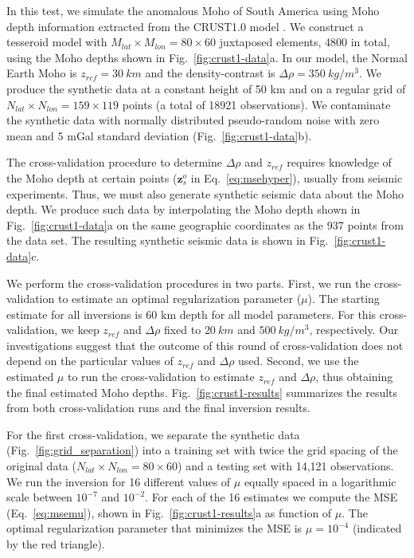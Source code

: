 \documentclass[extra,mreferee]{gji}
\begin{document}
In this test, we simulate the anomalous Moho of South America
using Moho depth information extracted from the CRUST1.0 model
\citep{laske2013}.
We construct a tesseroid model with
$M_{lat} \times M_{lon} = 80 \times 60$ juxtaposed elements, 4800 in total,
using the Moho depths shown in Fig.~\ref{fig:crust1-data}a.
In our model, the Normal Earth Moho is $z_{ref} = 30\ km$ and
the density-contrast is $\Delta\rho = 350\ kg/m^3$.
We produce the synthetic data at a constant height of 50 km
and on a regular grid of $N_{lat} \times N_{lon} = 159 \times 119$ points
(a total of 18921 observations).
We contaminate the synthetic data with normally distributed pseudo-random noise
with zero mean and 5 mGal standard deviation (Fig.~\ref{fig:crust1-data}b).

The cross-validation procedure to determine $\Delta\rho$ and $z_{ref}$
requires knowledge of the Moho depth at certain points
($\mathbf{z}_s^o$ in Eq.~\ref{eq:msehyper}),
usually from seismic experiments.
Thus, we must also generate synthetic seismic data about the Moho depth.
We produce such data by interpolating the Moho depth shown in
Fig.~\ref{fig:crust1-data}a on the same geographic coordinates
as the 937 points from the \citet{assumpcao2013a} data set.
The resulting synthetic seismic data is shown in Fig.~\ref{fig:crust1-data}c.

We perform the cross-validation procedures in two parts.
First, we run the cross-validation to estimate
an optimal regularization parameter ($\mu$).
The starting estimate for all inversions is
60 km depth for all model parameters.
For this cross-validation,
we keep $z_{ref}$ and $\Delta\rho$ fixed to
$20\ km$ and $500\ kg/m^3$, respectively.
Our investigations suggest that the outcome of this round of cross-validation
does not depend on the particular values of $z_{ref}$ and $\Delta\rho$ used.
Second, we use the estimated $\mu$ to run the cross-validation
to estimate $z_{ref}$ and $\Delta\rho$,
thus obtaining the final estimated Moho depths.
Fig.~\ref{fig:crust1-results} summarizes the results
from both cross-validation runs and the final inversion results.

For the first cross-validation,
we separate the synthetic data (Fig.~\ref{fig:grid_separation}) into
a training set with twice the grid spacing of the original data
($N_{lat} \times N_{lon} = 80 \times 60$)
and a testing set with 14,121 observations.
We run the inversion for 16 different values of $\mu$
equally spaced in a logarithmic scale between $10^{-7}$ and $10^{-2}$.
For each of the 16 estimates we compute the MSE (Eq.~\ref{eq:msemu}),
shown in Fig.~\ref{fig:crust1-results}a as function of $\mu$.
The optimal regularization parameter that minimizes the MSE is $\mu = 10^{-4}$
(indicated by the red triangle).
\end{document}
